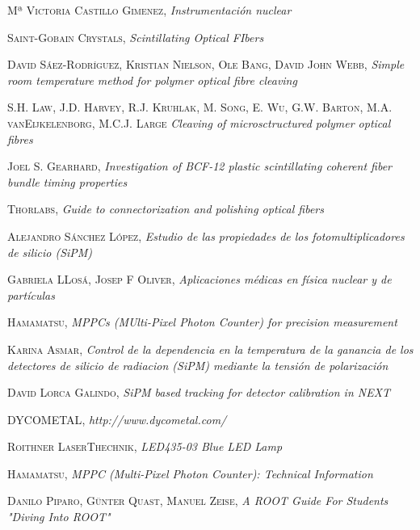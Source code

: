\begin{thebibliography}{99}
 \textsc{Mª Victoria Castillo Gimenez},
\textit{Instrumentación nuclear} 

 \textsc{Saint-Gobain Crystals},
\textit{Scintillating Optical FIbers}

 \textsc{David Sáez-Rodríguez}, \textsc{Kristian Nielson}, \textsc{Ole Bang}, \textsc{David John Webb},
\textit{Simple room temperature method for polymer optical fibre cleaving}

 \textsc{S.H. Law}, \textsc{J.D. Harvey}, \textsc{R.J. Kruhlak}, \textsc{M. Song}, \textsc{E. Wu}, \textsc{G.W. Barton}, \textsc{M.A. vanEijkelenborg}, \textsc{M.C.J. Large}
\textit{Cleaving of microsctructured polymer optical fibres}

 \textsc{Joel S. Gearhard},
\textit{Investigation of BCF-12 plastic scintillating coherent fiber bundle timing properties}

 \textsc{Thorlabs},
\textit{Guide to connectorization and polishing optical fibers}

 \textsc{Alejandro Sánchez López},
\textit{Estudio de las propiedades de los fotomultiplicadores de silicio (SiPM)}

 \textsc{Gabriela LLosá}, \textsc{Josep F Oliver},
\textit{Aplicaciones médicas en física nuclear y de partículas}

 \textsc{Hamamatsu},
\textit{MPPCs (MUlti-Pixel Photon Counter) for precision measurement}

 \textsc{Karina Asmar},
\textit{Control de la dependencia en la temperatura de la ganancia de los detectores de silicio de radiacion (SiPM) mediante la tensión de polarización}

 \textsc{David Lorca Galindo},
\textit{SiPM based tracking for detector calibration in NEXT}

 \textsc{DYCOMETAL},
\textit{http://www.dycometal.com/}

 \textsc{Roithner LaserThechnik},
\textit{LED435-03 Blue LED Lamp}

 \textsc{Hamamatsu},
\textit{MPPC (Multi-Pixel Photon Counter): Technical Information}

 \textsc{Danilo Piparo}, \textsc{Günter Quast}, \textsc{Manuel Zeise},
\textit{A ROOT Guide For Students "Diving Into ROOT"}


\end{thebibliography}
